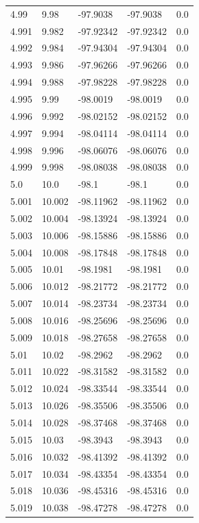 \begin{tabular}{lllll}
4.99 & 9.98 & -97.9038 & -97.9038 & 0.0 \\
4.991 & 9.982 & -97.92342 & -97.92342 & 0.0 \\
4.992 & 9.984 & -97.94304 & -97.94304 & 0.0 \\
4.993 & 9.986 & -97.96266 & -97.96266 & 0.0 \\
4.994 & 9.988 & -97.98228 & -97.98228 & 0.0 \\
4.995 & 9.99 & -98.0019 & -98.0019 & 0.0 \\
4.996 & 9.992 & -98.02152 & -98.02152 & 0.0 \\
4.997 & 9.994 & -98.04114 & -98.04114 & 0.0 \\
4.998 & 9.996 & -98.06076 & -98.06076 & 0.0 \\
4.999 & 9.998 & -98.08038 & -98.08038 & 0.0 \\
5.0 & 10.0 & -98.1 & -98.1 & 0.0 \\
5.001 & 10.002 & -98.11962 & -98.11962 & 0.0 \\
5.002 & 10.004 & -98.13924 & -98.13924 & 0.0 \\
5.003 & 10.006 & -98.15886 & -98.15886 & 0.0 \\
5.004 & 10.008 & -98.17848 & -98.17848 & 0.0 \\
5.005 & 10.01 & -98.1981 & -98.1981 & 0.0 \\
5.006 & 10.012 & -98.21772 & -98.21772 & 0.0 \\
5.007 & 10.014 & -98.23734 & -98.23734 & 0.0 \\
5.008 & 10.016 & -98.25696 & -98.25696 & 0.0 \\
5.009 & 10.018 & -98.27658 & -98.27658 & 0.0 \\
5.01 & 10.02 & -98.2962 & -98.2962 & 0.0 \\
5.011 & 10.022 & -98.31582 & -98.31582 & 0.0 \\
5.012 & 10.024 & -98.33544 & -98.33544 & 0.0 \\
5.013 & 10.026 & -98.35506 & -98.35506 & 0.0 \\
5.014 & 10.028 & -98.37468 & -98.37468 & 0.0 \\
5.015 & 10.03 & -98.3943 & -98.3943 & 0.0 \\
5.016 & 10.032 & -98.41392 & -98.41392 & 0.0 \\
5.017 & 10.034 & -98.43354 & -98.43354 & 0.0 \\
5.018 & 10.036 & -98.45316 & -98.45316 & 0.0 \\
5.019 & 10.038 & -98.47278 & -98.47278 & 0.0 \\

\end{tabular}
